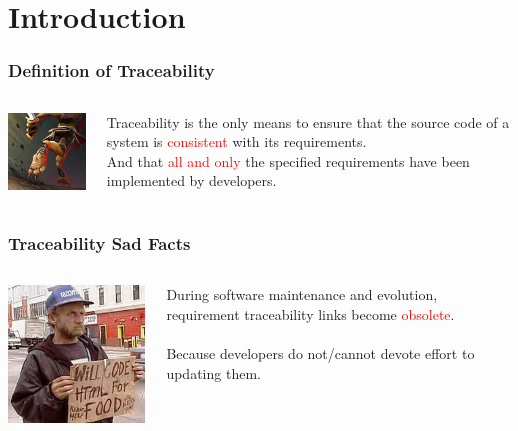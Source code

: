 \documentclass[12pt,hyperref=true,mathserif]{beamer}
\begin{document}
\section{Introduction}
\begin{frame}
\frametitle{Definition of Traceability}
\begin{columns}
\begin{column}{0.5\textwidth}
\includegraphics[scale=0.75]{bounty-hunter-track}
\end{column}
\begin{column}{0.5\textwidth}
Traceability is the only means to ensure that the source code of a system is \textcolor{red}{consistent} with its requirements. \\
And that \textcolor{red}{all and only} the specified requirements have been implemented by developers.
\end{column}
\end{columns}
\end{frame}

\begin{frame}
\frametitle{Traceability Sad Facts}
\begin{columns}
\begin{column}{0.5\textwidth}
\includegraphics[scale=0.5]{code-for-food}
\end{column}
\begin{column}{0.5\textwidth}
During software maintenance and evolution, requirement traceability links become \textcolor{red}{obsolete}.\\
~\\
Because developers do not/cannot devote effort to updating them.
\end{column}
\end{columns}
\end{frame}
\end{document}
